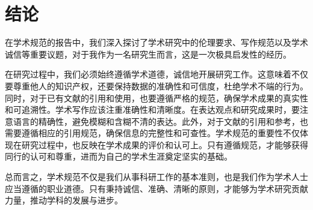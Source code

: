\documentclass[12pt,hyperref,a4paper,UTF8]{ctexart}
\begin{document}
\section{结论}

在学术规范的报告中，我们深入探讨了学术研究中的伦理要求、写作规范以及学术诚信等重要议题，对于我作为一名研究生而言，这是一次极具启发性的经历。

在研究过程中，我们必须始终遵循学术道德，诚信地开展研究工作。这意味着不仅要尊重他人的知识产权，还要保持数据的准确性和可信度，杜绝学术不端的行为。同时，对于已有文献的引用和使用，也要遵循严格的规范，确保学术成果的真实性和可追溯性。学术写作应该注重准确性和清晰度。在表达观点和研究成果时，要注意语言的精确性，避免模糊和含糊不清的表达。此外，对于文献的引用和参考，也需要遵循相应的引用规范，确保信息的完整性和可查性。学术规范的重要性不仅体现在研究过程中，也反映在学术成果的评价和认可上。只有遵循规范，才能够获得同行的认可和尊重，进而为自己的学术生涯奠定坚实的基础。

总而言之，学术规范不仅是我们从事科研工作的基本准则，也是我们作为学术人士应当遵循的职业道德。只有秉持诚信、准确、清晰的原则，才能够为学术研究贡献力量，推动学科的发展与进步。

\newpage
{}
\end{document}
